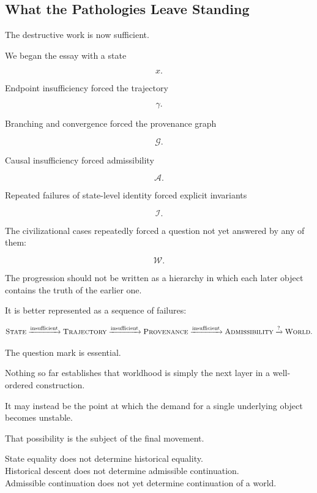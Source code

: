 \documentclass[
  11pt,
  a4paper,
  DIV=12,
  BCOR=0mm,
  parskip=half-
]{scrartcl}
\newcommand{\graphG}{\mathcal G}
\newcommand{\Inv}{\mathcal I}
\newcommand{\Adm}{\mathcal A}
\newcommand{\World}{\mathcal W}
\theoremstyle{definition}
\theoremstyle{plain}
\theoremstyle{remark}
\begin{document}

\subsection{What the Pathologies Leave Standing}
\label{sec:pathologies-forced}

The destructive work is now sufficient.

We began the essay with a state

\[
  x.
\]

Endpoint insufficiency forced the trajectory

\[
  \gamma.
\]

Branching and convergence forced the provenance graph

\[
  \graphG.
\]

Causal insufficiency forced admissibility

\[
  \Adm.
\]

Repeated failures of state-level identity forced explicit invariants

\[
  \Inv.
\]

The civilizational cases repeatedly forced a question not yet answered by any
of them:

\[
  \World.
\]

The progression should not be written as a hierarchy in which each later
object contains the truth of the earlier one.

It is better represented as a sequence of failures:

\[
  \textsc{State}
  \xrightarrow{\text{insufficient}}
  \textsc{Trajectory}
  \xrightarrow{\text{insufficient}}
  \textsc{Provenance}
  \xrightarrow{\text{insufficient}}
  \textsc{Admissibility}
  \xrightarrow{\text{?}}
  \textsc{World}.
\]

The question mark is essential.

Nothing so far establishes that worldhood is simply the next layer in a
well-ordered construction.

It may instead be the point at which the demand for a single underlying
object becomes unstable.

That possibility is the subject of the final movement.

\begin{held}
\centering
State equality does not determine historical equality.\\
Historical descent does not determine admissible continuation.\\
Admissible continuation does not yet determine continuation of a world.
\end{held}
\end{document}
